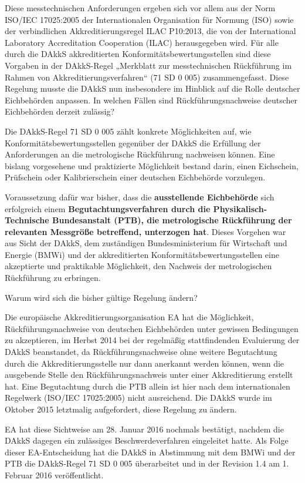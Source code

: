 Diese messtechnischen Anforderungen ergeben sich vor allem aus der Norm ISO/IEC 17025:2005 der Internationalen Organisation für Normung (ISO) sowie der verbindlichen Akkreditierungsregel ILAC P10:2013, die von der International Laboratory Accreditation Cooperation (ILAC) herausgegeben wird. Für alle durch die DAkkS akkreditierten Konformitätsbewertungsstellen sind diese Vorgaben in der DAkkS-Regel „Merkblatt zur messtechnischen Rückführung im Rahmen von Akkreditierungsverfahren“ (71 SD 0 005) zusammengefasst. Diese Regelung musste die DAkkS nun insbesondere im Hinblick auf die Rolle deutscher Eichbehörden anpassen.
In welchen Fällen sind Rückführungsnachweise deutscher Eichbehörden derzeit zulässig?

Die DAkkS-Regel 71 SD 0 005 zählt konkrete Möglichkeiten auf, wie Kon\-for\-mitäts\-bewertungs\-stellen gegenüber der DAkkS die Erfüllung der Anforderungen an die metrologische Rückführung nachweisen können. Eine bislang vorgesehene und praktizierte Möglichkeit bestand darin, einen Eichschein, Prüfschein oder Kalibrierschein einer deutschen Eichbehörde vorzulegen.

Voraussetzung dafür war bisher, dass die \textbf{ausstellende Eichbehörde} sich erfolgreich einem \textbf{Begutachtungsverfahren durch die Physikalisch-Technische Bundesanstalt (PTB), die metrologische Rückführung der relevanten Messgröße betreffend, unterzogen hat}. Dieses Vorgehen war aus Sicht der DAkkS, dem zuständigen Bundesministerium für Wirtschaft und Energie (BMWi) und der akkreditierten Konformitätsbewertungsstellen eine akzeptierte und praktikable Möglichkeit, den Nachweis der metrologischen Rückführung zu erbringen.

Warum wird sich die bisher gültige Regelung ändern?

Die europäische Akkreditierungsorganisation EA hat die Möglichkeit, Rückführungsnachweise von deutschen Eichbehörden unter gewissen Bedingungen zu akzeptieren, im Herbst 2014 bei der regelmäßig stattfindenden Evaluierung der DAkkS beanstandet, da Rückführungsnachweise ohne weitere Begutachtung durch die Akkreditierungsstelle nur dann anerkannt werden können, wenn die ausgebende Stelle den Rückführungsnachweis unter einer Akkreditierung erstellt hat. Eine Begutachtung durch die PTB allein ist hier nach dem internationalen Regelwerk (ISO/IEC 17025:2005) nicht ausreichend. Die DAkkS wurde im Oktober 2015 letztmalig aufgefordert, diese Regelung zu ändern.

EA hat diese Sichtweise am 28. Januar 2016 nochmals bestätigt, nachdem die DAkkS dagegen ein zulässiges Beschwerdeverfahren eingeleitet hatte. Als Folge dieser EA-Entscheidung hat die DAkkS in Abstimmung mit dem BMWi und der PTB die DAkkS-Regel 71 SD 0 005 überarbeitet und in der Revision 1.4 am 1. Februar 2016 veröffentlicht.

